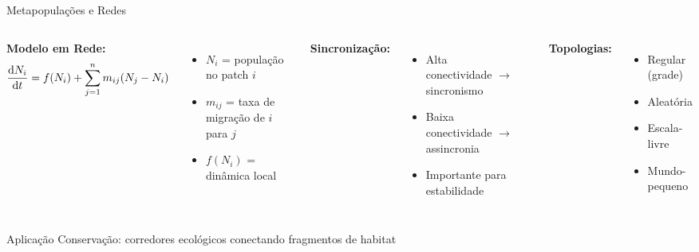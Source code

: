 \begin{frame}{Metapopulações e Redes}
\begin{columns}
\textbf{Modelo em Rede:}
\begin{equation*}
\frac{\mathrm{d} N_i}{\mathrm{d} t} = f(N_i) + \sum_{j=1}^{n} m_{ij}(N_j - N_i)
\end{equation*}

\begin{itemize}
    \item $N_i$ = população no patch $i$
    \item $m_{ij}$ = taxa de migração de $i$ para $j$
    \item $f(N_i)$ = dinâmica local
\end{itemize}

\textbf{Sincronização:}
\begin{itemize}
    \item Alta conectividade $\to$ sincronismo
    \item Baixa conectividade $\to$ assincronia
    \item Importante para estabilidade
\end{itemize}

\begin{center}
\end{center}

\textbf{Topologias:}
\begin{itemize}
    \item Regular (grade)
    \item Aleatória
    \item Escala-livre
    \item Mundo-pequeno
\end{itemize}
\end{columns}

\begin{exampleblock}{Aplicação}
Conservação: corredores ecológicos conectando fragmentos de habitat
\end{exampleblock}
\end{frame}

